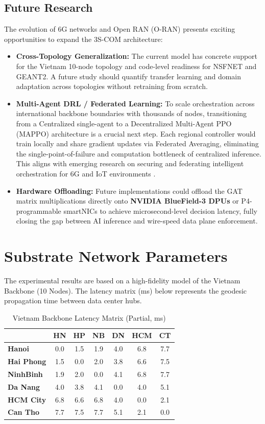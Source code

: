 \documentclass[12pt, a4paper, reqno, oneside]{book}
\begin{document}
\section{Future Research}
The evolution of 6G networks and Open RAN (O-RAN) presents exciting opportunities to expand the 3S-COM architecture:
\begin{itemize}
    \item \textbf{Cross-Topology Generalization:} The current model has concrete support for the Vietnam 10-node topology and code-level readiness for NSFNET and GEANT2. A future study should quantify transfer learning and domain adaptation across topologies without retraining from scratch.
    \item \textbf{Multi-Agent DRL / Federated Learning:} To scale orchestration across international backbone boundaries with thousands of nodes, transitioning from a Centralized single-agent to a Decentralized Multi-Agent PPO (MAPPO) architecture is a crucial next step. Each regional controller would train locally and share gradient updates via Federated Averaging, eliminating the single-point-of-failure and computation bottleneck of centralized inference. This aligns with emerging research on securing and federating intelligent orchestration for 6G and IoT environments \cite{kantarci2025federated, wang2022securing}.
    \item \textbf{Hardware Offloading:} Future implementations could offload the GAT matrix multiplications directly onto \textbf{NVIDIA BlueField-3 DPUs} or P4-programmable smartNICs to achieve microsecond-level decision latency, fully closing the gap between AI inference and wire-speed data plane enforcement.
\end{itemize}

\appendix
\chapter{Substrate Network Parameters}
\label{appendix:topology}
The experimental results are based on a high-fidelity model of the Vietnam Backbone (10 Nodes). The latency matrix (ms) below represents the geodesic propagation time between data center hubs.

\begin{table}[H]
\centering
\caption{Vietnam Backbone Latency Matrix (Partial, ms)}
\label{table:appendix_latency}
\small
\begin{tabular}{l|cccccc}
\toprule
 & \textbf{HN} & \textbf{HP} & \textbf{NB} & \textbf{DN} & \textbf{HCM} & \textbf{CT} \\
\midrule
\textbf{Hanoi}     & 0.0 & 1.5 & 1.9 & 4.0 & 6.8 & 7.7 \\
\textbf{Hai Phong} & 1.5 & 0.0 & 2.0 & 3.8 & 6.6 & 7.5 \\
\textbf{NinhBinh}  & 1.9 & 2.0 & 0.0 & 4.1 & 6.8 & 7.7 \\
\textbf{Da Nang}   & 4.0 & 3.8 & 4.1 & 0.0 & 4.0 & 5.1 \\
\textbf{HCM City}  & 6.8 & 6.6 & 6.8 & 4.0 & 0.0 & 2.1 \\
\textbf{Can Tho}   & 7.7 & 7.5 & 7.7 & 5.1 & 2.1 & 0.0 \\
\bottomrule
\end{tabular}
\end{table}
\end{document}
